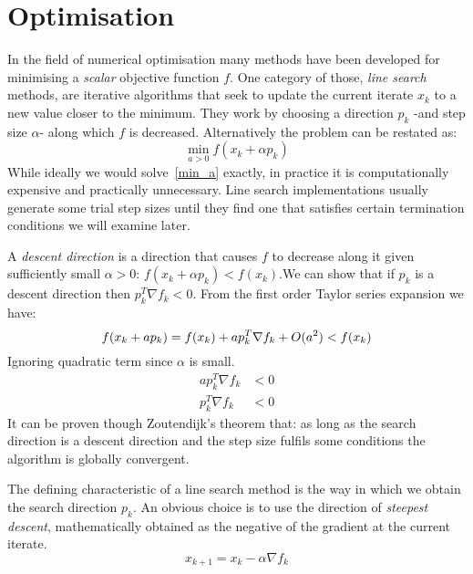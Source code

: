 \documentclass[11pt]{article}
\begin{document}
    \section{Optimisation}
    In the field of numerical optimisation many methods have been developed for minimising a \textit{scalar} objective function $f$.
    One category of those, \textit{line search} methods, are iterative algorithms that seek to update the current iterate $x_k$ to a new value closer to the minimum.
    They work by choosing a direction $p_k$ -and step size $\alpha$- along which $f$ is decreased.
    Alternatively the problem can be restated as:
    \begin{equation}
        \min_{a>0} f(x_k + \alpha p_k) \label{min_a}
    \end{equation}
    While ideally we would solve~\eqref{min_a} exactly, in practice it is computationally expensive and practically unnecessary.
    Line search implementations usually generate some trial step sizes until they find one that satisfies certain termination conditions we will examine later.

    A \textit{descent direction} is a direction that causes $f$ to decrease along it given sufficiently small $\alpha > 0$: $f(x_k + \alpha p_k) < f(x_k)$.We can show that if $p_k$ is a descent direction then $p_k^T \nabla f_k < 0$.
    From the first order Taylor series expansion we have:
    \begin{equation*}
        f(x_k+ap_k) = f(x_k) + a p_k^T \nabla f_k + O(a^2)< f(x_k) \\
    \end{equation*}
    Ignoring quadratic term since $\alpha$ is small.
    \begin{align*}
        a p_k^T \nabla f_k &< 0 \\
        p_k^T \nabla f_k &< 0
    \end{align*}
    It can be proven though Zoutendijk's theorem that: as long as the search direction is a descent direction and the step size fulfils some conditions the algorithm is globally convergent.

    The defining characteristic of a line search method is the way in which we obtain the search direction $p_k$.
    An obvious choice is to use the direction of \textit{steepest descent}, mathematically obtained as the negative of the gradient at the current iterate.
    \begin{equation}
        x_{k+1} = x_k - \alpha \nabla f_k
    \end{equation}
\end{document}
